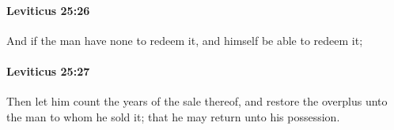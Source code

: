 		\paragraph{Leviticus 25:26} %
			\label{LEVITICUS-25-26}

			And if the man have none to redeem it, and himself be able to redeem it;


		\paragraph{Leviticus 25:27} %
			\label{LEVITICUS-25-27}

			Then let him count the years of the sale thereof, and restore the overplus unto the man to whom he sold it; that he may return unto his possession.


